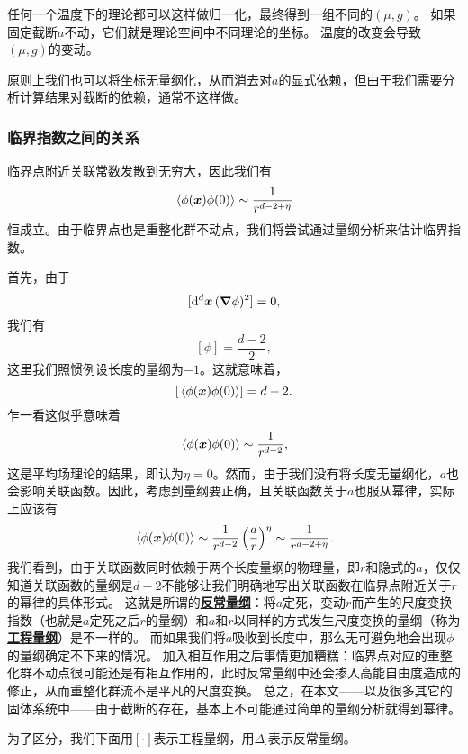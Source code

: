 \documentclass[hyperref, UTF8, a4paper]{ctexart}
\newcommand*{\concept}[1]{\underline{\textbf{#1}}}
\begin{document}
任何一个温度下的理论都可以这样做归一化，最终得到一组不同的$(\mu, g)$。
如果固定截断$a$不动，它们就是理论空间中不同理论的坐标。
温度的改变会导致$(\mu, g)$的变动。

原则上我们也可以将坐标无量纲化，从而消去对$a$的显式依赖，但由于我们需要分析计算结果对截断的依赖，通常不这样做。

\subsubsection{临界指数之间的关系}

临界点附近关联常数发散到无穷大，因此我们有
\[
    \expval*{\phi(\vb*{x}) \phi(0)} \sim \frac{1}{r^{d-2+\eta}}
\]
恒成立。由于临界点也是重整化群不动点，我们将尝试通过量纲分析来估计临界指数。

首先，由于
\[
    [\dd[d]{\vb*{x}} (\grad{\phi})^2] = 0,
\]
我们有
\[
    [\phi] = \frac{d-2}{2},
\]
这里我们照惯例设长度的量纲为$-1$。这就意味着，
\[
    [\expval*{\phi(\vb*{x}) \phi(0)}] = d-2.
\]
乍一看这似乎意味着
\[
    \expval*{\phi(\vb*{x}) \phi(0)} \sim \frac{1}{r^{d-2}},
\]
这是平均场理论的结果，即认为$\eta=0$。然而，由于我们没有将长度无量纲化，$a$也会影响关联函数。因此，考虑到量纲要正确，且关联函数关于$a$也服从幂律，实际上应该有
\begin{equation}
    \expval*{\phi(\vb*{x}) \phi(0)} \sim \frac{1}{r^{d-2}} \left( \frac{a}{r} \right)^\eta \sim \frac{1}{r^{d-2+\eta}}.
    \label{eq:correlation-scaling}
\end{equation}
我们看到，由于关联函数同时依赖于两个长度量纲的物理量，即$r$和隐式的$a$，仅仅知道关联函数的量纲是$d-2$不能够让我们明确地写出关联函数在临界点附近关于$r$的幂律的具体形式。
这就是所谓的\concept{反常量纲}：将$a$定死，变动$r$而产生的尺度变换指数（也就是$a$定死之后$r$的量纲）和$a$和$r$以同样的方式发生尺度变换的量纲（称为\concept{工程量纲}）是不一样的。
而如果我们将$a$吸收到长度中，那么无可避免地会出现$\phi$的量纲确定不下来的情况。
加入相互作用之后事情更加糟糕：临界点对应的重整化群不动点很可能还是有相互作用的，此时反常量纲中还会掺入高能自由度造成的修正，从而重整化群流不是平凡的尺度变换。
总之，在本文——以及很多其它的固体系统中——由于截断的存在，基本上不可能通过简单的量纲分析就得到幂律。

为了区分，我们下面用$[\cdot]$表示工程量纲，用$\Delta_{\cdot}$表示反常量纲。
\end{document}
